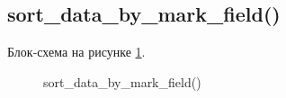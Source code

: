 \subsection{sort\_data\_by\_mark\_field()}

Блок-схема на рисунке \ref{fig:sort_data_by_mark_field}.

\begin{figure}[p]
    \caption{sort\_data\_by\_mark\_field()}
    \label{fig:sort_data_by_mark_field}
\end{figure}





\newpage